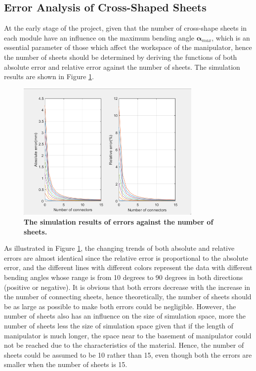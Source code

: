 \subsection{Error Analysis of Cross-Shaped Sheets}
At the early stage of the project, given that the number of cross-shape sheets in each module have an 
influence on the maximum bending angle $\boldsymbol{\alpha}_{max}$, which is an essential parameter of those which 
affect the workspace of the manipulator, hence the number of sheets should be determined by deriving 
the functions of both absolute error and relative error \cite{fishboneCR} against the number of sheets. The 
simulation results are shown in Figure \ref{fig:error_analysis}.
\begin{figure}[H] %
    \centering 
    \captionsetup{labelsep=colon}
    \includegraphics[width=0.8\textwidth]{Image/Result/error_analysis.png} 
    \caption[The simulation results of errors against the number of sheets]
    {\centering \textbf{The simulation results of errors against the number of sheets.}}
    \label{fig:error_analysis}
\end{figure}
As illustrated in Figure \ref{fig:error_analysis}, the changing trends of both absolute and 
relative errors are almost identical since 
the relative error is proportional to the absolute error, and the different lines with different colors represent 
the data with different bending angles whose range is from 10 degrees to 90 degrees in both directions (positive 
or negative). It is obvious that both errors decrease with the increase in the number of connecting sheets, hence 
theoretically, the number of sheets should be as large as possible to make both errors could be negligible. However, 
the number of sheets also has an influence on the size of simulation space, more the number of sheets less the size 
of simulation space given that if the length of manipulator is much longer, the space near to the basement of 
manipulator could not be reached due to the characteristics of the material. Hence, the number of sheets could be 
assumed to be 10 rather than 15, even though both the errors are smaller when the number of sheets is 15. 
